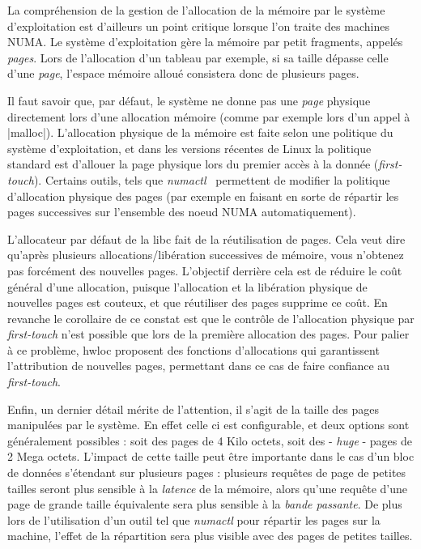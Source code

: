 La compréhension de la gestion de l'allocation de la mémoire par le système d'exploitation est d'ailleurs un point critique lorsque l'on traite des machines NUMA.
Le système d'exploitation gère la mémoire par petit fragments, appelés \emph{pages}.
Lors de l'allocation d'un tableau par exemple, si sa taille dépasse celle d'une \emph{page}, l'espace mémoire alloué consistera donc de plusieurs pages.

Il faut savoir que, par défaut, le système ne donne pas une \emph{page} physique directement lors d'une allocation mémoire (comme par exemple lors d'un appel à |malloc|).
L'allocation physique de la mémoire est faite selon une politique du système d'exploitation, et dans les versions récentes de Linux la politique standard est d'allouer la page physique lors du premier accès à la donnée (\emph{first-touch}).
Certains outils, tels que \emph{numactl}~\cite{numactl} permettent de modifier la politique d'allocation physique des pages (par exemple en faisant en sorte de répartir les pages successives sur l'ensemble des noeud NUMA automatiquement).

L'allocateur par défaut de la libc fait de la réutilisation de pages. Cela veut dire qu'après plusieurs allocations/libération successives de mémoire, vous n'obtenez pas forcément des nouvelles pages.
L'objectif derrière cela est de réduire le coût général d'une allocation, puisque l'allocation et la libération physique de nouvelles pages est couteux, et que réutiliser des pages supprime ce coût.
En revanche le corollaire de ce constat est que le contrôle de l'allocation physique par \emph{first-touch} n'est possible que lors de la première allocation des pages.
Pour palier à ce problème, hwloc proposent des fonctions d'allocations qui garantissent l'attribution de nouvelles pages, permettant dans ce cas de faire confiance au \emph{first-touch}.

Enfin, un dernier détail mérite de l'attention, il s'agit de la taille des pages manipulées par le système.
En effet celle ci est configurable, et deux options sont généralement possibles : soit des pages de 4 Kilo octets, soit des - \emph{huge} - pages de 2 Mega octets.
L'impact de cette taille peut être importante dans le cas d'un bloc de données s'étendant sur plusieurs pages : plusieurs requêtes de page de petites tailles seront plus sensible à la \emph{latence} de la mémoire, alors qu'une requête d'une page de grande taille équivalente sera plus sensible à la \emph{bande passante}.
De plus lors de l'utilisation d'un outil tel que \emph{numactl} pour répartir les pages sur la machine, l'effet de la répartition sera plus visible avec des pages de petites tailles.



